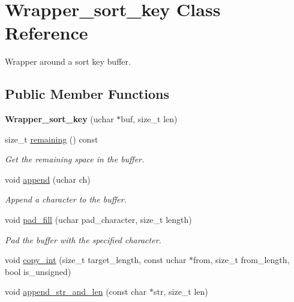 \hypertarget{classWrapper__sort__key}{}\section{Wrapper\+\_\+sort\+\_\+key Class Reference}
\label{classWrapper__sort__key}


Wrapper around a sort key buffer.  


\subsection*{Public Member Functions}
\begin{DoxyCompactItemize}
\item 
\mbox{\label{classWrapper__sort__key_a2637e3d716aa2fef970f7d978f3e5f59}} 
{\bfseries Wrapper\+\_\+sort\+\_\+key} (uchar $\ast$buf, size\+\_\+t len)
\item 
\mbox{\label{classWrapper__sort__key_ade7b13ed98198f789485c73b7b53ef01}} 
size\+\_\+t \mbox{\hyperlink{classWrapper__sort__key_ade7b13ed98198f789485c73b7b53ef01}{remaining}} () const
\begin{DoxyCompactList}\small\item\em Get the remaining space in the buffer. \end{DoxyCompactList}\item 
\mbox{\label{classWrapper__sort__key_a30240a1542484ec349d9df74392c7a37}} 
void \mbox{\hyperlink{classWrapper__sort__key_a30240a1542484ec349d9df74392c7a37}{append}} (uchar ch)
\begin{DoxyCompactList}\small\item\em Append a character to the buffer. \end{DoxyCompactList}\item 
\mbox{\label{classWrapper__sort__key_a96c87424b808b7491b251936fa1ac252}} 
void \mbox{\hyperlink{classWrapper__sort__key_a96c87424b808b7491b251936fa1ac252}{pad\+\_\+fill}} (uchar pad\+\_\+character, size\+\_\+t length)
\begin{DoxyCompactList}\small\item\em Pad the buffer with the specified character. \end{DoxyCompactList}\item 
void \mbox{\hyperlink{classWrapper__sort__key_ac22304eb125f9784d9d133a5a99be48b}{copy\+\_\+int}} (size\+\_\+t target\+\_\+length, const uchar $\ast$from, size\+\_\+t from\+\_\+length, bool is\+\_\+unsigned)
\item 
void \mbox{\hyperlink{classWrapper__sort__key_a0c56a83c72d63abf2c6bded0f2d62e11}{append\+\_\+str\+\_\+and\+\_\+len}} (const char $\ast$str, size\+\_\+t len)
\end{DoxyCompactItemize}


